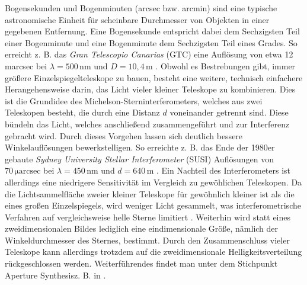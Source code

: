 Bogensekunden und Bogenminuten (arcsec bzw. arcmin) sind eine typische astronomische Einheit für scheinbare Durchmesser von Objekten in einer gegebenen Entfernung. 
Eine Bogensekunde entspricht dabei dem Sechzigsten Teil einer Bogenminute und eine Bogenminute dem Sechzigsten Teil eines Grades. 
So erreicht z. B. das \emph{Gran Telescopio Canarias} (GTC) eine Auflösung von etwa 12\,marcsec bei $\lambda=500\,\mathrm{nm}$ und $D=10{,}4\,\mathrm{m}$ \cite{GranTelescopioCANARIAS}. 
Obwohl es Bestrebungen gibt, immer größere Einzelspiegelteleskope zu bauen, besteht eine weitere, technisch einfachere Herangehensweise darin, das Licht vieler kleiner Teleskope zu kombinieren. 
Dies ist die Grundidee des Michelson-Sterninterferometers, welches aus zwei Teleskopen besteht, die durch eine Distanz $d$ voneinander getrennt sind. 
Diese bündeln das Licht, welches anschließend zusammengeführt und zur Interferenz gebracht wird. 
Durch dieses Vorgehen lassen sich deutlich bessere Winkelauflösungen bewerkstelligen. 
So erreichte z. B. das Ende der 1980er gebaute \emph{Sydney University Stellar Interferometer} (SUSI) Auflösungen von $70\,\mathrm{\mu arcsec}$ bei $\lambda=450\,\mathrm{nm}$ und $d=640\,\mathrm{m}$ \cite{davisSydneyUniversityStellar1999}. 
Ein Nachteil des Interferometers ist allerdings eine niedrigere Sensitivität im Vergleich zu gewöhlichen Teleskopen. 
Da die Lichtsammelfläche zweier kleiner Teleskope für gewöhnlich kleiner ist als die eines großen Einzelspiegels, wird weniger Licht gesammelt, was interferometrische Verfahren auf vergleichsweise helle Sterne limitiert \cite[Kap. 6.1]{foxQuantumOpticsIntroduction2006}. 
Weiterhin wird statt eines zweidimensionalen Bildes lediglich eine eindimensionale Größe, nämlich der Winkeldurchmesser des Sternes, bestimmt. 
Durch den Zusammenschluss vieler Teleskope kann allerdings trotzdem auf die zweidimensionale Helligkeitsverteilung rückgeschlossen werden. 
Weiterführendes findet man unter dem Stichpunkt \glqq Aperture Synthesis\grqq\;z. B. in \cite[Kap. 10]{burkeIntroductionRadioAstronomy2019}. \\

